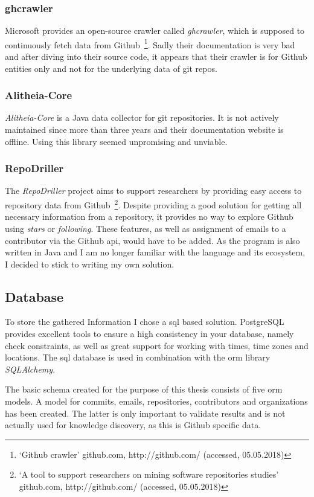 \subsubsection{ghcrawler}
Microsoft provides an open-source crawler called \emph{ghcrawler}, which is supposed to continuously fetch data from Github~\footnote{`Github crawler' github.com, http://github.com/ (accessed, 05.05.2018)}.
Sadly their documentation is very bad and after diving into their source code, it appears that their crawler is for Github entities only and not for the underlying data of git repos.

\subsubsection{Alitheia-Core}
\emph{Alitheia-Core} is a Java data collector for git repositories.
It is not actively maintained since more than three years and their documentation website is offline.
Using this library seemed unpromising and unviable.

\subsubsection{RepoDriller}
The \emph{RepoDriller} project aims to support researchers by providing easy access to repository data from Github~\footnote{`A tool to support researchers on mining software repositories studies' github.com, http://github.com/ (accessed, 05.05.2018)}.
Despite providing a good solution for getting all necessary information from a repository, it provides no way to explore Github using \emph{stars} or \emph{following}.
These features, as well as assignment of emails to a contributor via the Github \ac{api}, would have to be added.
As the program is also written in Java and I am no longer familiar with the language and its ecosystem, I decided to stick to writing my own solution.

\subsection{Database}\label{gitalizer-database}
To store the gathered Information I chose a \ac{sql} based solution.
PostgreSQL provides excellent tools to ensure a high consistency in your database, namely check constraints, as well as great support for working with times, time zones and locations.
The \ac{sql} database is used in combination with the \ac{orm} library \emph{SQLAlchemy}.

The basic schema created for the purpose of this thesis consists of five \ac{orm} models.
A model for commits, emails, repositories, contributors and organizations has been created.
The latter is only important to validate results and is not actually used for knowledge discovery, as this is Github specific data.

